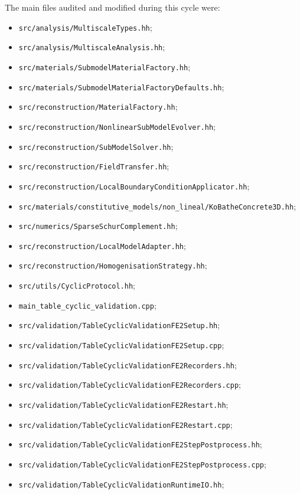 The main files audited and modified during this cycle were:
\begin{itemize}
  \item \texttt{src/analysis/MultiscaleTypes.hh};
  \item \texttt{src/analysis/MultiscaleAnalysis.hh};
  \item \texttt{src/materials/SubmodelMaterialFactory.hh};
  \item \texttt{src/materials/SubmodelMaterialFactoryDefaults.hh};
  \item \texttt{src/reconstruction/MaterialFactory.hh};
  \item \texttt{src/reconstruction/NonlinearSubModelEvolver.hh};
  \item \texttt{src/reconstruction/SubModelSolver.hh};
  \item \texttt{src/reconstruction/FieldTransfer.hh};
  \item \texttt{src/reconstruction/LocalBoundaryConditionApplicator.hh};
  \item \texttt{src/materials/constitutive\_models/non\_lineal/KoBatheConcrete3D.hh};
  \item \texttt{src/numerics/SparseSchurComplement.hh};
  \item \texttt{src/reconstruction/LocalModelAdapter.hh};
  \item \texttt{src/reconstruction/HomogenisationStrategy.hh};
  \item \texttt{src/utils/CyclicProtocol.hh};
  \item \texttt{main\_table\_cyclic\_validation.cpp};
  \item \texttt{src/validation/TableCyclicValidationFE2Setup.hh};
  \item \texttt{src/validation/TableCyclicValidationFE2Setup.cpp};
  \item \texttt{src/validation/TableCyclicValidationFE2Recorders.hh};
  \item \texttt{src/validation/TableCyclicValidationFE2Recorders.cpp};
  \item \texttt{src/validation/TableCyclicValidationFE2Restart.hh};
  \item \texttt{src/validation/TableCyclicValidationFE2Restart.cpp};
  \item \texttt{src/validation/TableCyclicValidationFE2StepPostprocess.hh};
  \item \texttt{src/validation/TableCyclicValidationFE2StepPostprocess.cpp};
  \item \texttt{src/validation/TableCyclicValidationRuntimeIO.hh};

\end{itemize}
